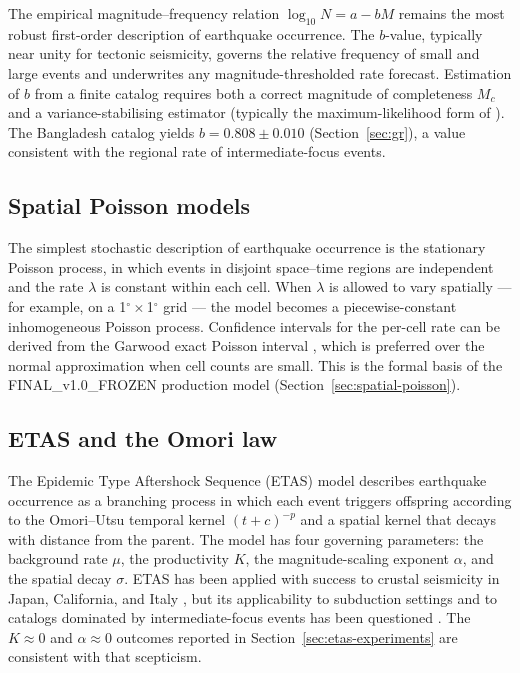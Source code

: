 \documentclass[10pt,a4paper,twocolumn]{article}
\begin{document}
The empirical magnitude--frequency relation $\log_{10} N = a - bM$ \cite{gutenberg1944} remains the most robust first-order description of earthquake occurrence. The $b$-value, typically near unity for tectonic seismicity, governs the relative frequency of small and large events and underwrites any magnitude-thresholded rate forecast. Estimation of $b$ from a finite catalog requires both a correct magnitude of completeness $M_c$ and a variance-stabilising estimator (typically the maximum-likelihood form of \cite{aki1965}). The Bangladesh catalog yields $b=0.808\pm0.010$ (Section~\ref{sec:gr}), a value consistent with the regional rate of intermediate-focus events.

\subsection{Spatial Poisson models}

The simplest stochastic description of earthquake occurrence is the stationary Poisson process, in which events in disjoint space--time regions are independent and the rate $\lambda$ is constant within each cell. When $\lambda$ is allowed to vary spatially --- for example, on a 1$^\circ\times$1$^\circ$ grid --- the model becomes a piecewise-constant inhomogeneous Poisson process. Confidence intervals for the per-cell rate can be derived from the Garwood exact Poisson interval \cite{garwood1936}, which is preferred over the normal approximation when cell counts are small. This is the formal basis of the FINAL\_v1.0\_FROZEN production model (Section~\ref{sec:spatial-poisson}).

\subsection{ETAS and the Omori law}

The Epidemic Type Aftershock Sequence (ETAS) model \cite{ogata1988} describes earthquake occurrence as a branching process in which each event triggers offspring according to the Omori--Utsu temporal kernel $(t+c)^{-p}$ and a spatial kernel that decays with distance from the parent. The model has four governing parameters: the background rate $\mu$, the productivity $K$, the magnitude-scaling exponent $\alpha$, and the spatial decay $\sigma$. ETAS has been applied with success to crustal seismicity in Japan, California, and Italy \cite{ogata1988, zhuang2011, marsan2008}, but its applicability to subduction settings and to catalogs dominated by intermediate-focus events has been questioned \cite{hainzl2008}. The $K\approx0$ and $\alpha\approx0$ outcomes reported in Section~\ref{sec:etas-experiments} are consistent with that scepticism.
\end{document}
